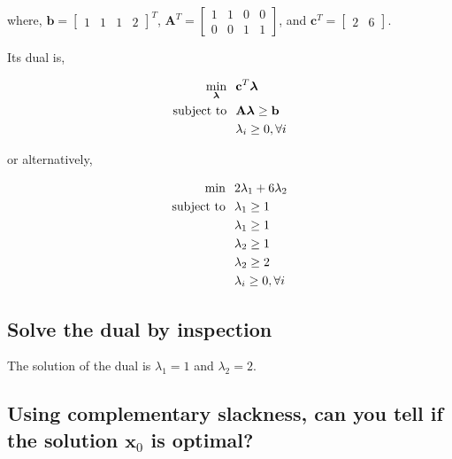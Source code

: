 \documentclass{article}
\begin{document}
\noindent where, $\mathbf{b} = \begin{bmatrix}1 & 1 & 1 & 2\end{bmatrix}^T$, $\mathbf{A}^T = \left[\begin{smallmatrix}1 & 1 & 0 & 0\\0 & 0 & 1 & 1\end{smallmatrix}\right]$, and $\mathbf{c}^T = \begin{bmatrix} 2 & 6 \end{bmatrix}$.

Its dual is,

\begin{align*}
\min_{\boldsymbol{\lambda}} & \hspace{0.1in} \mathbf{c}^T \boldsymbol{\lambda}\\
\text{subject to} & \hspace{0.1in} \mathbf{A} \boldsymbol{\lambda} \ge \mathbf{b}\\
& \hspace{0.1in} \lambda_i \ge 0, \forall i
\end{align*}

or alternatively,

\begin{align*}
\text{min} & \hspace{0.1in} 2\lambda_1 + 6\lambda_2\\
\text{subject to} & \hspace{0.1in} \lambda_1 \ge 1\\
& \hspace{0.1in} \lambda_1 \ge 1\\
& \hspace{0.1in} \lambda_2 \ge 1\\
& \hspace{0.1in} \lambda_2 \ge 2\\
& \hspace{0.1in} \lambda_i \ge 0, \forall i
\end{align*}

\subsection{Solve the dual by inspection}

The solution of the dual is $\lambda_1 = 1$ and $\lambda_2 = 2$.

\subsection{Using complementary slackness, can you tell if the solution $\mathbf{x}_0$ is optimal?} \label{sec:compl_slack}
\end{document}
